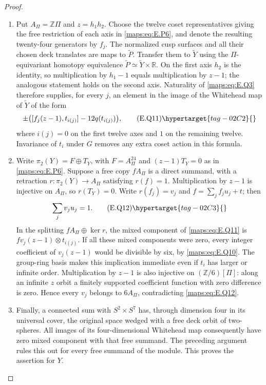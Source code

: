 \begin{proof}
\begin{enumerate}[label={$\langle1\rangle$\arabic*.},leftmargin=*]
\item Put $A_\Pi=\mathbb Z\Pi$ and $z=h_1h_2$.  Choose the twelve
coset representatives giving the free restriction of each
axis in \eqref{maps:eq:E.P6}, and denote the resulting twenty-four generators
by $f_j$.  The normalized cusp surfaces and all their chosen
deck translates are maps to $\widetilde P$.  Transfer
them to $\widetilde Y$ using the $\Pi$-equivariant homotopy
equivalence $\widetilde P\simeq\widetilde Y\times\mathbb R$.
On the first axis $h_2$ is the identity, so multiplication
by $h_1-1$ equals multiplication by $z-1$; the analogous
statement holds on the second axis.  Naturality of \eqref{maps:eq:E.Q3}
therefore supplies, for every $j$, an element in the image
of the Whitehead map of $\widetilde Y$ of the form
\[
 \pm\bigl([f_j(z-1),t_{i(j)}]-12q(t_{i(j)})\bigr),
 \tag{E.Q11}\hypertarget{tag-02C2}{}\label{maps:eq:E.Q11}
\]
where $i(j)=0$ on the first twelve axes and $1$ on the
remaining twelve.  Invariance of $t_i$ under $G$ removes
any extra coset action in this formula.

\item Write $\pi_2(Y)=F\oplus T_Y$, with $F=A_\Pi^{24}$ and
$(z-1)T_Y=0$ as in \eqref{maps:eq:E.P6}.  Suppose a free copy $fA_\Pi$
is a direct summand, with a retraction $r:\pi_2(Y)\to A_\Pi$
satisfying $r(f)=1$.  Multiplication by $z-1$ is injective
on $A_\Pi$, so $r(T_Y)=0$.  Write $r(f_j)=v_j$ and
$f=\sum_j f_j u_j+t$; then
\[
                         \sum_j v_j u_j=1.
 \tag{E.Q12}\hypertarget{tag-02C3}{}\label{maps:eq:E.Q12}
\]
In the splitting $fA_\Pi\oplus\ker r$, the mixed component
of \eqref{maps:eq:E.Q11} is $f v_j(z-1)\otimes t_{i(j)}$.  If all these
mixed components were zero, every integer coefficient of
$v_j(z-1)$ would be divisible by six, by \eqref{maps:eq:E.Q10}.  The
group-ring basis makes this implication immediate even if
$t_i$ has larger or infinite order.  Multiplication by
$z-1$ is also injective on $(\mathbb Z/6)[\Pi]$: along an
infinite $z$ orbit a finitely supported coefficient function
with zero difference is zero.  Hence every $v_j$ belongs
to $6A_\Pi$, contradicting \eqref{maps:eq:E.Q12}.

\item Finally, a connected sum with $S^2\times S^7$ has, through
dimension four in its universal cover, the original space
wedged with a free deck orbit of two-spheres.  All images
of its four-dimensional Whitehead map consequently have
zero mixed component with that free summand.  The preceding
argument rules this out for every free summand of the module.  This proves the assertion for $Y$.
\end{enumerate}
\end{proof}




